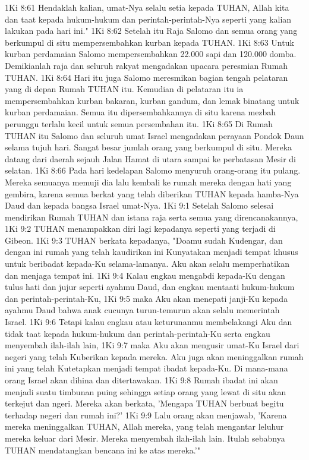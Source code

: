 1Ki 8:61  Hendaklah kalian, umat-Nya selalu setia kepada TUHAN, Allah kita dan taat kepada hukum-hukum dan perintah-perintah-Nya seperti yang kalian lakukan pada hari ini."
1Ki 8:62  Setelah itu Raja Salomo dan semua orang yang berkumpul di situ mempersembahkan kurban kepada TUHAN.
1Ki 8:63  Untuk kurban perdamaian Salomo mempersembahkan 22.000 sapi dan 120.000 domba. Demikianlah raja dan seluruh rakyat mengadakan upacara peresmian Rumah TUHAN.
1Ki 8:64  Hari itu juga Salomo meresmikan bagian tengah pelataran yang di depan Rumah TUHAN itu. Kemudian di pelataran itu ia mempersembahkan kurban bakaran, kurban gandum, dan lemak binatang untuk kurban perdamaian. Semua itu dipersembahkannya di situ karena mezbah perunggu terlalu kecil untuk semua persembahan itu.
1Ki 8:65  Di Rumah TUHAN itu Salomo dan seluruh umat Israel mengadakan perayaan Pondok Daun selama tujuh hari. Sangat besar jumlah orang yang berkumpul di situ. Mereka datang dari daerah sejauh Jalan Hamat di utara sampai ke perbatasan Mesir di selatan.
1Ki 8:66  Pada hari kedelapan Salomo menyuruh orang-orang itu pulang. Mereka semuanya memuji dia lalu kembali ke rumah mereka dengan hati yang gembira, karena semua berkat yang telah diberikan TUHAN kepada hamba-Nya Daud dan kepada bangsa Israel umat-Nya.
1Ki 9:1  Setelah Salomo selesai mendirikan Rumah TUHAN dan istana raja serta semua yang direncanakannya,
1Ki 9:2  TUHAN menampakkan diri lagi kepadanya seperti yang terjadi di Gibeon.
1Ki 9:3  TUHAN berkata kepadanya, "Doamu sudah Kudengar, dan dengan ini rumah yang telah kaudirikan ini Kunyatakan menjadi tempat khusus untuk beribadat kepada-Ku selama-lamanya. Aku akan selalu memperhatikan dan menjaga tempat ini.
1Ki 9:4  Kalau engkau mengabdi kepada-Ku dengan tulus hati dan jujur seperti ayahmu Daud, dan engkau mentaati hukum-hukum dan perintah-perintah-Ku,
1Ki 9:5  maka Aku akan menepati janji-Ku kepada ayahmu Daud bahwa anak cucunya turun-temurun akan selalu memerintah Israel.
1Ki 9:6  Tetapi kalau engkau atau keturunanmu membelakangi Aku dan tidak taat kepada hukum-hukum dan perintah-perintah-Ku serta engkau menyembah ilah-ilah lain,
1Ki 9:7  maka Aku akan mengusir umat-Ku Israel dari negeri yang telah Kuberikan kepada mereka. Aku juga akan meninggalkan rumah ini yang telah Kutetapkan menjadi tempat ibadat kepada-Ku. Di mana-mana orang Israel akan dihina dan ditertawakan.
1Ki 9:8  Rumah ibadat ini akan menjadi suatu timbunan puing sehingga setiap orang yang lewat di situ akan terkejut dan ngeri. Mereka akan berkata, 'Mengapa TUHAN berbuat begitu terhadap negeri dan rumah ini?'
1Ki 9:9  Lalu orang akan menjawab, 'Karena mereka meninggalkan TUHAN, Allah mereka, yang telah mengantar leluhur mereka keluar dari Mesir. Mereka menyembah ilah-ilah lain. Itulah sebabnya TUHAN mendatangkan bencana ini ke atas mereka.'"
